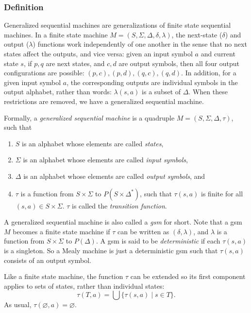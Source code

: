 \documentclass[12pt]{article}
\begin{document}
\subsubsection*{Definition}

Generalized sequential machines are generalizations of finite state sequential machines.  In a finite state machine $M=(S,\Sigma,\Delta,\delta,\lambda)$, the next-state ($\delta$) and output ($\lambda$) functions work independently of one another in the sense that no next states affect the outputs, and vice versa: given an input symbol $a$ and current state $s$, if $p,q$ are next states, and $c,d$ are output symbols, then all four output configurations are possible: $(p,c), (p,d), (q,c), (q,d)$.  In addition, for a given input symbol $a$, the corresponding outputs are individual symbols in the output alphabet, rather than words: $\lambda(s,a)$ is a subset of $\Delta$.  When these restrictions are removed, we have a generalized sequential machine.

Formally, a \emph{generalized sequential machine} is a quadruple $M=(S,\Sigma,\Delta,\tau)$, such that
\begin{enumerate}
\item $S$ is an alphabet whose elements are called \emph{states},
\item $\Sigma$ is an alphabet whose elements are called \emph{input symbols},
\item $\Delta$ is an alphabet whose elements are called \emph{output symbols}, and
\item $\tau$ is a function from $S\times \Sigma$ to $P(S\times \Delta^*)$, such that $\tau(s,a)$ is finite for all $(s,a) \in S\times \Sigma$.  $\tau$ is called the \emph{transition function}.
\end{enumerate}
A generalized sequential machine is also called a \emph{gsm} for short.  Note that a gsm $M$ becomes a finite state machine if $\tau$ can be written as $(\delta,\lambda)$, and $\lambda$ is a function from $S\times \Sigma$ to $P(\Delta)$.  A gsm is said to be \emph{deterministic} if each $\tau(s,a)$ is a singleton.  So a Mealy machine is just a deterministic gsm such that $\tau(s,a)$ consists of an output symbol.

Like a finite state machine, the function $\tau$ can be extended so its first component applies to sets of states, rather than individual states:  $$\tau(T,a)=\bigcup \lbrace \tau(s,a)\mid s\in T\rbrace.$$  As usual, $\tau(\varnothing,a)=\varnothing$.
\end{document}
